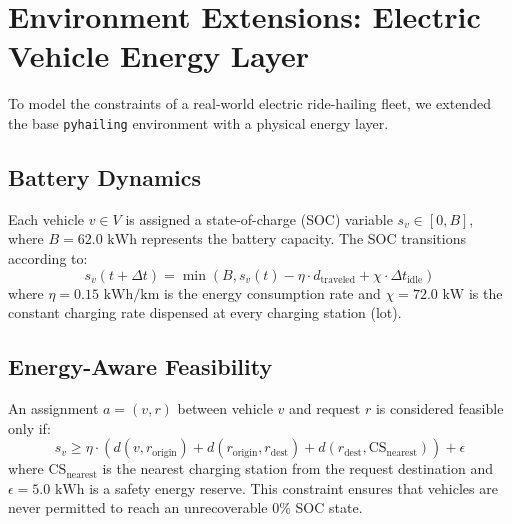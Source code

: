 \section{Environment Extensions: Electric Vehicle Energy Layer}
To model the constraints of a real-world electric ride-hailing fleet, we extended the base \texttt{pyhailing} environment with a physical energy layer. 

\subsection{Battery Dynamics}
Each vehicle $v \in V$ is assigned a state-of-charge (SOC) variable $s_v \in [0, B]$, where $B = 62.0 \text{ kWh}$ represents the battery capacity. The SOC transitions according to:
\begin{equation}
s_v(t + \Delta t) = \min \left( B, s_v(t) - \eta \cdot d_{\text{traveled}} + \chi \cdot \Delta t_{\text{idle}} \right)
\end{equation}
where $\eta = 0.15 \text{ kWh/km}$ is the energy consumption rate and $\chi = 72.0 \text{ kW}$ is the constant charging rate dispensed at every charging station (lot).

\subsection{Energy-Aware Feasibility}
An assignment $a = (v, r)$ between vehicle $v$ and request $r$ is considered feasible only if:
\begin{equation}
s_v \geq \eta \cdot (d(v, r_{\text{origin}}) + d(r_{\text{origin}}, r_{\text{dest}}) + d(r_{\text{dest}}, \text{CS}_{\text{nearest}})) + \epsilon
\end{equation}
where $\text{CS}_{\text{nearest}}$ is the nearest charging station from the request destination and $\epsilon = 5.0 \text{ kWh}$ is a safety energy reserve. This constraint ensures that vehicles are never permitted to reach an unrecoverable 0\% SOC state.
